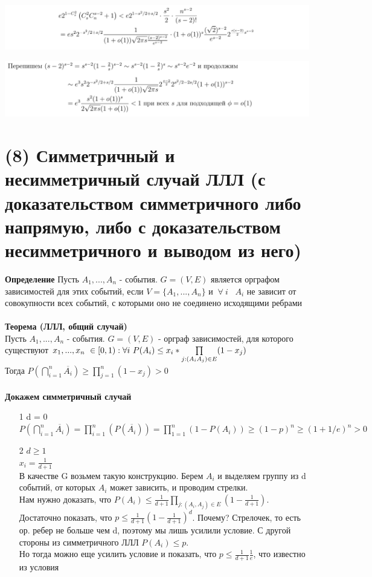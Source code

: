 \includegraphics[width=18cm]{images/polina_13.PNG}

\includegraphics[width=18cm]{images/polina_14.PNG}
\EndProof
\section{(8) Симметричный и несимметричный случай ЛЛЛ (с доказательством симметричного либо напрямую, либо с доказательством несимметричного и выводом из него)}
\textbf{Определение} Пусть $A_1, ..., A_n$ - события. $G = (V,E)$ является орграфом зависимостей для этих событий, если $V = \{A_1,..., A_n\}$ и $\ \forall \ i$
\ $A_i$ не зависит от совокупности всех событий, с которыми оно не соединено исходящими ребрами
\\
\\
\textbf{ Теорема (ЛЛЛ, общий случай)} 
\\
Пусть $A_1, ..., A_n$ - события.  $G = (V,E)$ - орграф зависимостей, для которого существуют $x_1, ..., x_n \ \in [0,1): \\ \forall i \ P(A_i) \leq x_i*\prod\limits_{j: (A_i A_j) \in E}(1-x_j)$
\\
Тогда $P(\bigcap\limits_{i=1}^n \overline{A_i}) \geq \prod\limits_{j=1}^n(1-x_j) > 0$
\\
\\
\textbf{Докажем симметричный случай}
\Proof
\begin{itemize}
    \item [1] d = 0
    \\ $P(\bigcap\limits_{i=1}^n \overline{A_i}) = \prod\limits_{i=1}^n(P(\overline{A_i})) = \prod\limits_{1=1}^n(1-P(A_i)) \geq (1-p)^n \geq (1+1/e)^n > 0 $
    \item[2] $d \geq 1$ \\ $x_i = \frac{1}{d+1}$
    \\
    В качестве G возьмем такую конструкцию. Берем $A_i$ и выделяем группу из d событий, от которых $A_i$ может зависить, и проводим стрелки.
    \\
    Нам нужно доказать, что $P(A_i) \leq \frac{1}{d+1}\prod\limits_{j: (A_i, A_j) \in E}(1 - \frac{1}{d+1})$. Достаточно показать, что $p \leq \frac{1}{d+1}(1 - \frac{1}{d+1})^d$. Почему? Стрелочек, то есть ор. ребер не больше чем d, поэтому мы лишь усилили условие. С другой стороны из симметричного ЛЛЛ  $P(A_i) \leq p$. 
    \\
    Но тогда можно еще усилить условие и показать, что  $p \leq \frac{1}{d+1}\frac{1}{e}$, что известно из условия
\end{itemize}
